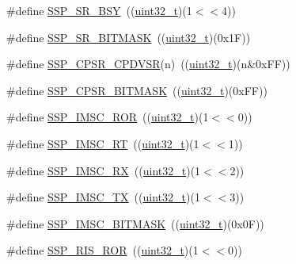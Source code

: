 \begin{DoxyCompactItemize}
\item 
\#define \hyperlink{group___s_s_p___private___macros_gac57c889d98458cfbde35f0ab63b499c2}{S\+S\+P\+\_\+\+S\+R\+\_\+\+B\+SY}~((\hyperlink{_p_e___types_8h_a33594304e786b158f3fb30289278f5af}{uint32\+\_\+t})(1$<$$<$4))
\item 
\#define \hyperlink{group___s_s_p___private___macros_ga0fe66130dd87296b6e16cd9fbcf7daf1}{S\+S\+P\+\_\+\+S\+R\+\_\+\+B\+I\+T\+M\+A\+SK}~((\hyperlink{_p_e___types_8h_a33594304e786b158f3fb30289278f5af}{uint32\+\_\+t})(0x1\+F))
\item 
\#define \hyperlink{group___s_s_p___private___macros_ga12dda8829af64148222e9c139b0b4190}{S\+S\+P\+\_\+\+C\+P\+S\+R\+\_\+\+C\+P\+D\+V\+SR}(n)~((\hyperlink{_p_e___types_8h_a33594304e786b158f3fb30289278f5af}{uint32\+\_\+t})(n\&0x\+F\+F))
\item 
\#define \hyperlink{group___s_s_p___private___macros_gad90cbeb91495d457ae2dd8bda909a2a9}{S\+S\+P\+\_\+\+C\+P\+S\+R\+\_\+\+B\+I\+T\+M\+A\+SK}~((\hyperlink{_p_e___types_8h_a33594304e786b158f3fb30289278f5af}{uint32\+\_\+t})(0x\+F\+F))
\item 
\#define \hyperlink{group___s_s_p___private___macros_gaa004d331d2d6bf2fc123de80d6e18a95}{S\+S\+P\+\_\+\+I\+M\+S\+C\+\_\+\+R\+OR}~((\hyperlink{_p_e___types_8h_a33594304e786b158f3fb30289278f5af}{uint32\+\_\+t})(1$<$$<$0))
\item 
\#define \hyperlink{group___s_s_p___private___macros_ga0396910287899ff6ab730425a8a332c7}{S\+S\+P\+\_\+\+I\+M\+S\+C\+\_\+\+RT}~((\hyperlink{_p_e___types_8h_a33594304e786b158f3fb30289278f5af}{uint32\+\_\+t})(1$<$$<$1))
\item 
\#define \hyperlink{group___s_s_p___private___macros_ga9f4d1fa05f49655cc6e5548b11dfe092}{S\+S\+P\+\_\+\+I\+M\+S\+C\+\_\+\+RX}~((\hyperlink{_p_e___types_8h_a33594304e786b158f3fb30289278f5af}{uint32\+\_\+t})(1$<$$<$2))
\item 
\#define \hyperlink{group___s_s_p___private___macros_ga0e1c817c6d276a0fd17b0c4d21668818}{S\+S\+P\+\_\+\+I\+M\+S\+C\+\_\+\+TX}~((\hyperlink{_p_e___types_8h_a33594304e786b158f3fb30289278f5af}{uint32\+\_\+t})(1$<$$<$3))
\item 
\#define \hyperlink{group___s_s_p___private___macros_gaaaf58d4122c6641ca6d1e6d18c5ef7be}{S\+S\+P\+\_\+\+I\+M\+S\+C\+\_\+\+B\+I\+T\+M\+A\+SK}~((\hyperlink{_p_e___types_8h_a33594304e786b158f3fb30289278f5af}{uint32\+\_\+t})(0x0\+F))
\item 
\#define \hyperlink{group___s_s_p___private___macros_ga0556e3aaa7aefef2c8ed76e1efbf277c}{S\+S\+P\+\_\+\+R\+I\+S\+\_\+\+R\+OR}~((\hyperlink{_p_e___types_8h_a33594304e786b158f3fb30289278f5af}{uint32\+\_\+t})(1$<$$<$0))

\end{DoxyCompactItemize}
